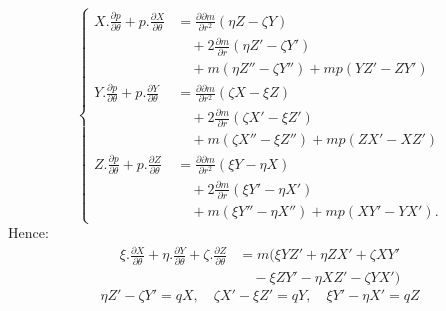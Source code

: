 \begin{equation}\tag{3}
\left\{\begin{aligned}
X.\frac{\partial p}{\partial\theta}+p.\frac{\partial X}{\partial\theta}&=\frac{\partial\partial m}{\partial r^2}(\eta Z-\zeta Y)\\
&\quad+2\frac{\partial m}{\partial r}(\eta Z'-\zeta Y')\\
&\quad+m(\eta Z''-\zeta Y'')+mp(YZ'-ZY')\\
Y.\frac{\partial p}{\partial\theta}+p.\frac{\partial Y}{\partial\theta}&=\frac{\partial\partial m}{\partial r^2}(\zeta X-\xi Z)\\
&\quad+2\frac{\partial m}{\partial r}(\zeta X'-\xi Z')\\
&\quad+m(\zeta X''-\xi Z'')+mp(ZX'-XZ')\\
Z.\frac{\partial p}{\partial\theta}+p.\frac{\partial Z}{\partial\theta}&=\frac{\partial\partial m}{\partial r^2}(\xi Y-\eta X)\\
&\quad+2\frac{\partial m}{\partial r}(\xi Y'-\eta X')\\
&\quad+m(\xi Y''-\eta X'')+mp(XY'-YX').
\end{aligned}\right.
\end{equation}
\indent Hence:
\[
\begin{aligned}
\xi.\frac{\partial X}{\partial\theta}+\eta.\frac{\partial Y}{\partial\theta}+\zeta.\frac{\partial Z}{\partial\theta}
&=m(\xi YZ'+\eta ZX'+\zeta XY'\\
&\quad-\xi ZY'-\eta XZ'-\zeta YX')
\end{aligned}
\]
\noindent [or, since]
\[
\eta Z'-\zeta Y'=qX,\quad\zeta X'-\xi Z'=qY,\quad\xi Y'-\eta X'=qZ
\]
